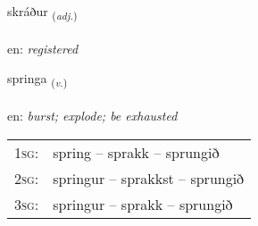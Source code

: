 \documentclass[frontgrid, backgrid]{flacards}\usepackage[]{graphicx}\usepackage[]{xcolor}
\begin{document}
\renewcommand{\flhead}{\vskip5pt \fboxsep=0pt {\small\bfseries\footnotesize Lýsingarorð | Adjective}}
\renewcommand{\fcfoot}{\vskip5pt \fboxsep=0pt \hspace{2pt}{\small\bfseries\footnotesize 3K}}

\renewcommand{\blhead}{\vskip5pt {\small\bfseries\footnotesize Lýsingarorð | Adjective }}
\renewcommand{\bcfoot}{\vskip5pt \hspace{2pt}{\small\bfseries\footnotesize 3K}}


{skráður \small{\textsubscript{(\textit{adj.})}} \\[1ex] %
\textphonetic{[skrauːðʏr]} \\
en: \emph{registered} \\  [2ex]
\renewcommand*{\arraystretch}{0.8}
}

\renewcommand{\flhead}{\vskip5pt \fboxsep=0pt {\small\bfseries\footnotesize Sagnorð | Verb}}
\renewcommand{\fcfoot}{\vskip5pt \fboxsep=0pt \hspace{2pt}{\small\bfseries\footnotesize 3K}}

\renewcommand{\blhead}{\vskip5pt {\small\bfseries\footnotesize Sagnorð | Verb }}
\renewcommand{\bcfoot}{\vskip5pt \hspace{2pt}{\small\bfseries\footnotesize 3K}}


{springa \small{\textsubscript{(\textit{v.})}} \\[1ex] %
\textphonetic{[spriŋka]} \\
en: \emph{burst; explode; be exhausted} \\  [2ex]
\renewcommand*{\arraystretch}{0.8}
\begin{tabular}{p{1cm}l}
\textsc{1sg}: & spring -- sprakk -- sprungið \\ 
\textsc{2sg}: & springur -- sprakkst -- sprungið \\ 
\textsc{3sg}: & springur -- sprakk -- sprungið \\ 
\end{tabular}
}
\end{document}
